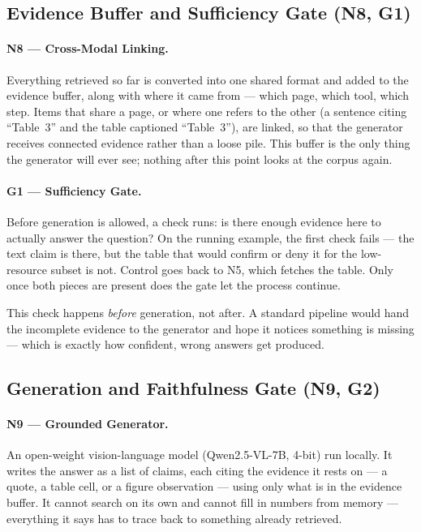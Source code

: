 \subsection{Evidence Buffer and Sufficiency Gate (N8, G1)}

\paragraph{N8 --- Cross-Modal Linking.}
Everything retrieved so far is converted into one shared format and added to the
evidence buffer, along with where it came from --- which page, which tool, which
step. Items that share a page, or where one refers to the other (a sentence citing
``Table~3'' and the table captioned ``Table~3''), are linked, so that the generator
receives connected evidence rather than a loose pile. This buffer is the only thing the generator will ever see; nothing after this
point looks at the corpus again.

\paragraph{G1 --- Sufficiency Gate.}
Before generation is allowed, a check runs: is there enough evidence here to
actually answer the question? On the running example, the first check fails --- the
text claim is there, but the table that would confirm or deny it for the
low-resource subset is not. Control goes back to N5, which fetches the table. Only
once both pieces are present does the gate let the process continue.

This check happens \emph{before} generation, not after. A standard pipeline would
hand the incomplete evidence to the generator and hope it notices something is
missing --- which is exactly how confident, wrong answers get produced.

\subsection{Generation and Faithfulness Gate (N9, G2)}

\paragraph{N9 --- Grounded Generator.}
An open-weight vision-language model (Qwen2.5-VL-7B, 4-bit) run locally. It writes
the answer as a list of claims, each citing the evidence it rests on --- a quote, a
table cell, or a figure observation --- using only what is in the evidence buffer. It cannot search on
its own and cannot fill in numbers from memory --- everything it says has to trace
back to something already retrieved.


